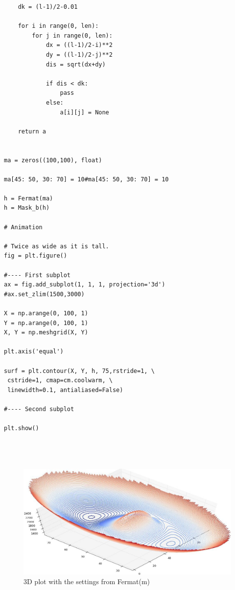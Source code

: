 \documentclass[pdftex,12pt,a4paper]{article}
\begin{document}
\begin{lstlisting}
    dk = (l-1)/2-0.01
    
    for i in range(0, len):
        for j in range(0, len):
            dx = ((l-1)/2-i)**2
            dy = ((l-1)/2-j)**2
            dis = sqrt(dx+dy)
            
            if dis < dk:
                pass
            else:
                a[i][j] = None
                
    return a    
    
    
ma = zeros((100,100), float)

ma[45: 50, 30: 70] = 10#ma[45: 50, 30: 70] = 10
        
h = Fermat(ma)
h = Mask_b(h)

# Animation

# Twice as wide as it is tall.
fig = plt.figure()

#---- First subplot
ax = fig.add_subplot(1, 1, 1, projection='3d')
#ax.set_zlim(1500,3000)

X = np.arange(0, 100, 1)
Y = np.arange(0, 100, 1)
X, Y = np.meshgrid(X, Y)

plt.axis('equal')

surf = plt.contour(X, Y, h, 75,rstride=1, \
 cstride=1, cmap=cm.coolwarm, \
 linewidth=0.1, antialiased=False)

#---- Second subplot

plt.show()




\end{lstlisting}

\begin{figure}[position=h]
\centering
 \caption{3D plot with the settings from Fermat(m)}
 \includegraphics[width=15cm]{Bilder/Fermat}%
\end{figure}
\end{document}

